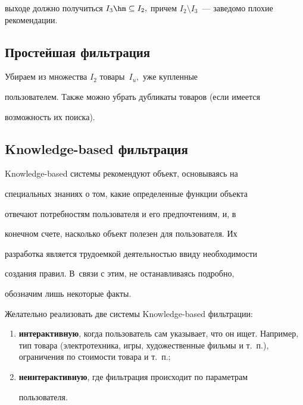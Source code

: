 выходе должно получиться $I_3 \hm\subseteq I_2,$ причем $I_2\setminus


I_3$~--- заведомо плохие рекомендации.





\subsection{Простейшая фильтрация}





Убираем из множества $I_2$ товары~$I_u,$ уже купленные


пользователем. Также можно убрать дубликаты товаров (если имеется


возможность их поиска).





\subsection{Knowledge-based фильтрация}





Knowledge-based системы рекомендуют объект, основываясь на


специальных знаниях о том, какие определенные функции объекта


отвечают потребностям пользователя и его предпочтениям, и, в


конечном счете, насколько объект полезен для пользователя. Их


разработка является трудоемкой деятельностью ввиду необходимости


создания правил. В~связи с этим, не останавливаясь подробно,


обозначим лишь некоторые факты.





\pagebreak





Желательно реализовать две системы Knowledge-based фильтрации:


\begin{enumerate}[(1)]


    \item \textbf{интерактивную}, когда пользователь сам указывает, что он ищет. Например, тип товара (электротехника, игры, художественные фильмы и т.~п.), ограничения по стоимости товара и т.~п.;


\item \textbf{неинтерактивную}, где фильтрация происходит по параметрам


пользова\-теля.


\end{enumerate}





